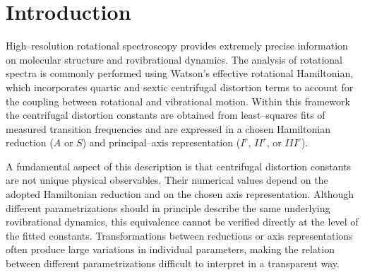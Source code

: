 \documentclass[aip,jcp,reprint,floatfix]{revtex4-2}
\begin{document}
\begin{abstract}
The resulting framework provides an operational route for transporting
centrifugal distortion constants between representations, analyzing
the numerical stability of spectroscopic fits, and quantifying the
limits of the linear transport picture implied by the standard VPT2
level. Illustrative applications to representative molecules,
including systems of intermediate size accessible to modern
spectroscopy and quantum-chemical workflows, demonstrate the behavior
of the proposed transport scheme and diagnostics across molecular
size. The present work thus establishes a practical bridge between
modern quantum-chemical calculations and high-resolution rotational
spectroscopy, and provides part of the conceptual basis for a future
extension toward a practical higher-order VPT route for systems beyond the
range where VCI is feasible.
\end{abstract}

\maketitle

\section{Introduction}

High--resolution rotational spectroscopy provides extremely precise
information on molecular structure and rovibrational dynamics.
\cite{TownesSchawlow1955,GordyCook1984,BunkerJensen2005}
The analysis of rotational spectra is commonly performed using
Watson's effective rotational Hamiltonian,
\cite{Watson1968,Watson1977,Watson1968JCP,AlievWatson1976}
which incorporates quartic and sextic centrifugal distortion terms to
account for the coupling between rotational and vibrational motion.
Within this framework the centrifugal distortion constants are obtained
from least--squares fits of measured transition frequencies and are
expressed in a chosen Hamiltonian reduction ($A$ or $S$) and
principal--axis representation ($I^r$, $II^r$, or $III^r$).

A fundamental aspect of this description is that centrifugal distortion
constants are not unique physical observables. Their numerical values
depend on the adopted Hamiltonian reduction and on the chosen axis
representation. Although different parametrizations should in principle
describe the same underlying rovibrational dynamics, this equivalence
cannot be verified directly at the level of the fitted constants.
Transformations between reductions or axis representations often produce
large variations in individual parameters, making the relation between
different parametrizations difficult to interpret in a transparent way.
\end{document}
